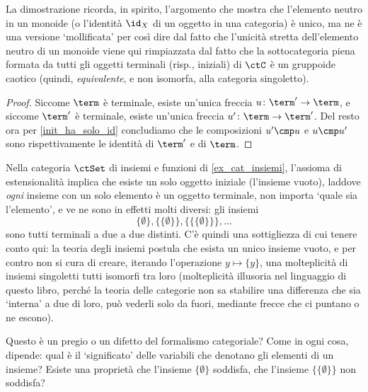 La dimostrazione ricorda, in spirito, l'argomento che mostra che l'elemento neutro in un monoide (o l'identità \(\id_X\) di un oggetto in una categoria) è unico, ma ne è una versione `mollificata' per così dire dal fatto che l'unicità stretta dell'elemento neutro di un monoide viene qui rimpiazzata dal fatto che la sottocategoria piena formata da tutti gli oggetti terminali (risp., iniziali) di \(\ctC\) è un gruppoide caotico (quindi, \emph{equivalente}, e non isomorfa, alla categoria singoletto).
\begin{proof}
	Siccome \(\term\) è terminale, esiste un'unica freccia \(u \colon \term'\to \term\), e siccome \(\term'\) è terminale, esiste un'unica freccia \(u' \colon \term\to\term'\). Del resto ora per \ref{init_ha_solo_id} concludiamo che le composizioni \(u'\cmp u\) e \(u\cmp u'\) sono rispettivamente le identità di \(\term'\) e di \(\term\).
\end{proof}
\begin{example}
	Nella categoria \(\ctSet\) di insiemi e funzioni di \ref{ex_cat_insiemi}, l'assioma di estensionalità implica che esiste un solo oggetto iniziale (l'insieme vuoto), laddove \emph{ogni} insieme con un solo elemento è un oggetto terminale, non importa `quale sia l'elemento', e ve ne sono in effetti molti diversi: gli insiemi
	\[\{\emptyset\},\{\{\emptyset\}\},\{\{\{\emptyset\}\}\},\dots\]
	sono tutti terminali a due a due distinti. C'è quindi una sottigliezza di cui tenere conto qui: la teoria degli insiemi postula che esista un unico insieme vuoto, e per contro non si cura di creare, iterando l'operazione \(y\mapsto\{y\}\), una molteplicità di insiemi singoletti tutti isomorfi tra loro (molteplicità illusoria nel linguaggio di questo libro, perché la teoria delle categorie non sa stabilire una differenza che sia `interna' a due di loro, può vederli solo da fuori, mediante frecce che ci puntano o ne escono).

	Questo è un pregio o un difetto del formalismo categoriale? Come in ogni cosa, dipende: qual è il `significato' delle variabili che denotano gli elementi di un insieme? Esiste una proprietà che l'insieme \(\{\emptyset\}\) soddisfa, che l'insieme \(\{\{\emptyset\}\}\) non soddisfa?
\end{example}
